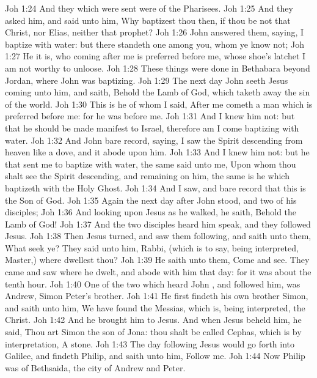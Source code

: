 \vs Joh 1:24 And they which were sent were of the Pharisees.
\vs Joh 1:25 And they asked him, and said unto him, Why baptizest thou then, if thou be not that Christ, nor Elias, neither that prophet?
\vs Joh 1:26 John answered them, saying, I baptize with water: but there standeth one among you, whom ye know not;
\vs Joh 1:27 He it is, who coming after me is preferred before me, whose shoe's latchet I am not worthy to unloose.
\vs Joh 1:28 These things were done in Bethabara beyond Jordan, where John was baptizing.
\vs Joh 1:29 The next day John seeth Jesus coming unto him, and saith, Behold the Lamb of God, which taketh away the sin of the world.
\vs Joh 1:30 This is he of whom I said, After me cometh a man which is preferred before me: for he was before me.
\vs Joh 1:31 And I knew him not: but that he should be made manifest to Israel, therefore am I come baptizing with water.
\vs Joh 1:32 And John bare record, saying, I saw the Spirit descending from heaven like a dove, and it abode upon him.
\vs Joh 1:33 And I knew him not: but he that sent me to baptize with water, the same said unto me, Upon whom thou shalt see the Spirit descending, and remaining on him, the same is he which baptizeth with the Holy Ghost.
\vs Joh 1:34 And I saw, and bare record that this is the Son of God.
\vs Joh 1:35 Again the next day after John stood, and two of his disciples;
\vs Joh 1:36 And looking upon Jesus as he walked, he saith, Behold the Lamb of God!
\vs Joh 1:37 And the two disciples heard him speak, and they followed Jesus.
\vs Joh 1:38 Then Jesus turned, and saw them following, and saith unto them, What seek ye? They said unto him, Rabbi, (which is to say, being interpreted, Master,) where dwellest thou?
\vs Joh 1:39 He saith unto them, Come and see. They came and saw where he dwelt, and abode with him that day: for it was about the tenth hour.
\vs Joh 1:40 One of the two which heard John , and followed him, was Andrew, Simon Peter's brother.
\vs Joh 1:41 He first findeth his own brother Simon, and saith unto him, We have found the Messias, which is, being interpreted, the Christ.
\vs Joh 1:42 And he brought him to Jesus. And when Jesus beheld him, he said, Thou art Simon the son of Jona: thou shalt be called Cephas, which is by interpretation, A stone.
\vs Joh 1:43 The day following Jesus would go forth into Galilee, and findeth Philip, and saith unto him, Follow me.
\vs Joh 1:44 Now Philip was of Bethsaida, the city of Andrew and Peter.
